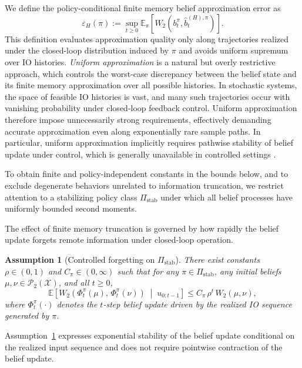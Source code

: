 \documentclass[letterpaper, 10 pt, conference]{ieeeconf}
\newtheorem{assumption}{Assumption}
\begin{document}
We define the policy-conditional finite memory belief approximation error as
\begin{equation}
\label{eq:belief-approx-error}
\varepsilon_H(\pi)
:=
\sup_{t\ge 0}
\mathbb{E}_\pi\!\left[
W_2\!\left(b_t^\pi,\hat b_t^{(H),\pi}\right)
\right].
\end{equation}
This definition evaluates approximation quality only along trajectories realized under the closed-loop distribution induced by $\pi$ and avoids uniform supremum over IO histories.
\emph{Uniform approximation} is a natural but overly restrictive approach, which controls the worst-case discrepancy between the belief state and its finite memory approximation over all possible histories.
In stochastic systems, the space of feasible IO histories is vast, and many such trajectories occur with vanishing probability under closed-loop feedback control.
Uniform approximation therefore impose unnecessarily strong requirements, effectively demanding accurate approximation even along exponentially rare sample paths.
In particular, uniform approximation implicitly requires pathwise stability of belief update under control, which is generally unavailable in controlled settings \cite{kara2022near, kara2024partially}.

To obtain finite and policy-independent constants in the bounds below, and to exclude degenerate behaviors unrelated to information truncation, we restrict attention to a stabilizing policy class $\Pi_{\mathrm{stab}}$ under which all belief processes have uniformly bounded second moments.

The effect of finite memory truncation is governed by how rapidly the belief update forgets remote information under closed-loop operation.

\begin{assumption}[Controlled forgetting on $\Pi_{\mathrm{stab}}$]
\label{assump:controlled-forgetting}
There exist constants $\rho\in(0,1)$ and $C_\pi\in(0,\infty)$ such that for any $\pi\in\Pi_{\mathrm{stab}}$, any initial beliefs $\mu,\nu\in\mathcal{P}_2(\mathcal{X})$, and all $t\ge 0$,
\begin{equation}
\mathbb{E}\!\left[ W_2\!\left(
\Phi_t^\pi(\mu),\,
\Phi_t^\pi(\nu)
\right)
\;\middle|\;
u_{0:t-1}
\right]
\le
C_\pi\,\rho^t\,W_2(\mu,\nu),
\end{equation}
where $\Phi_t^\pi(\cdot)$ denotes the $t$-step belief update driven by the realized IO sequence generated by $\pi$.
\end{assumption}
\noindent
Assumption~\ref{assump:controlled-forgetting} expresses exponential stability of the belief update conditional on the realized input sequence and does not require pointwise contraction of the belief update.
\end{document}
